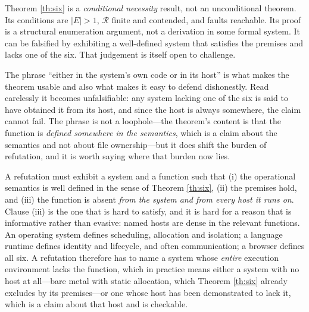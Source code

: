 \begin{remark}\label{rmk:six-nature}
Theorem \ref{th:six} is a \emph{conditional necessity} result, not an unconditional theorem.
Its conditions are $|E| > 1$, $\mathcal{R}$ finite and contended, and faults reachable. Its
proof is a structural enumeration argument, not a derivation in some formal system. It can
be falsified by exhibiting a well-defined system that satisfies the premises and lacks one
of the six. That judgement is itself open to challenge.
\end{remark}

\begin{remark}\label{rmk:six-escape}
The phrase ``either in the system's own code or in its host'' is what makes the theorem usable and
also what makes it easy to defend dishonestly. Read carelessly it becomes unfalsifiable: any system
lacking one of the six is said to have obtained it from its host, and since the host is always
somewhere, the claim cannot fail. The phrase is not a loophole---the theorem's content is that the
function is \emph{defined somewhere in the semantics}, which is a claim about the semantics and not
about file ownership---but it does shift the burden of refutation, and it is worth saying where that
burden now lies.

A refutation must exhibit a system and a function such that (i) the operational semantics is well
defined in the sense of Theorem \ref{th:six}, (ii) the premises hold, and (iii) the function is
absent \emph{from the system and from every host it runs on}. Clause (iii) is the one that is hard to
satisfy, and it is hard for a reason that is informative rather than evasive: named hosts are dense
in the relevant functions. An operating system defines scheduling, allocation and isolation; a
language runtime defines identity and lifecycle, and often communication; a browser defines all six.
A refutation therefore has to name a system whose \emph{entire} execution environment lacks the
function, which in practice means either a system with no host at all---bare metal with static
allocation, which Theorem \ref{th:six} already excludes by its premises---or one whose host has been
demonstrated to lack it, which is a claim about that host and is checkable.


\end{remark}
